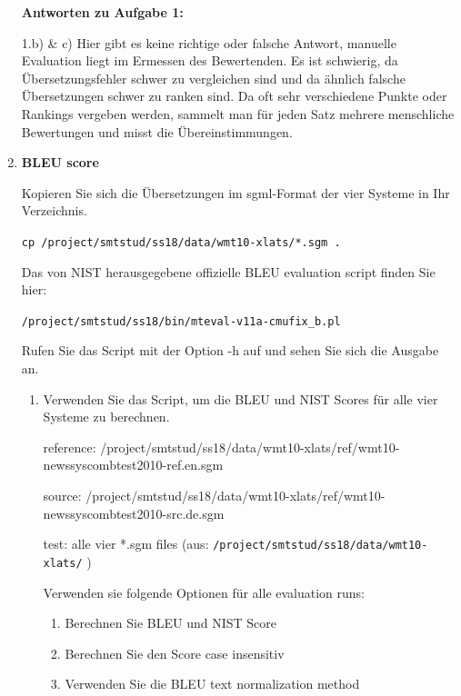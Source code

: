 \documentclass[12pt,fleqn]{article}
\begin{document}
\begin{enumerate}
\textbf{Antworten zu Aufgabe 1:} 

1.b) \& c) Hier gibt es keine richtige oder falsche Antwort, manuelle Evaluation liegt im Ermessen des Bewertenden.
Es ist schwierig, da Übersetzungsfehler schwer zu vergleichen sind und da ähnlich falsche Übersetzungen schwer zu ranken sind.
Da oft sehr verschiedene Punkte oder Rankings vergeben werden, sammelt man für jeden Satz mehrere menschliche Bewertungen und misst die Übereinstimmungen.


\vspace{0.5cm} 
\item \textbf{BLEU score} 

\vspace{0.5cm} 
Kopieren Sie sich die Übersetzungen im sgml-Format der vier Systeme in Ihr Verzeichnis.

\texttt{cp /project/smtstud/ss18/data/wmt10-xlats/*.sgm .} 

\vspace{0.5cm} 
Das von NIST herausgegebene offizielle BLEU evaluation script finden Sie hier:

\texttt{/project/smtstud/ss18/bin/mteval-v11a-cmufix\_b.pl} 

\vspace{0.5cm} 
Rufen Sie das Script mit der Option -h auf und sehen Sie sich die Ausgabe an.

\vspace{0.5cm} 
\begin{enumerate} 
\item Verwenden Sie das Script, um die BLEU und NIST Scores für alle vier Systeme zu berechnen.

\vspace{0.5cm} 
reference: /project/smtstud/ss18/data/wmt10-xlats/ref/wmt10-newssyscombtest2010-ref.en.sgm

source:     
/project/smtstud/ss18/data/wmt10-xlats/ref/wmt10-newssyscombtest2010-src.de.sgm

test:            alle vier *.sgm files (aus: \texttt{/project/smtstud/ss18/data/wmt10-xlats/} )

\vspace{0.5cm} 
Verwenden sie folgende Optionen für alle evaluation runs:

\vspace{0.5cm} 
\begin{enumerate} 
\item Berechnen Sie BLEU und NIST Score
\item Berechnen Sie den Score case insensitiv
\item Verwenden Sie die BLEU text normalization method
\end{enumerate} 


\end{enumerate}
\end{enumerate}
\end{document}
